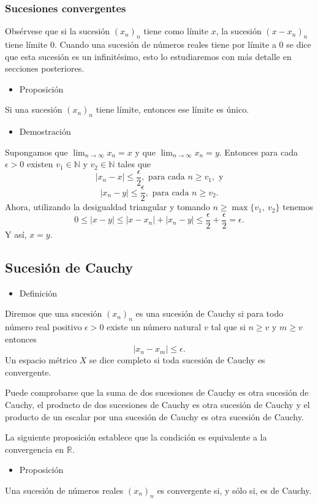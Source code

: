 \documentclass[12pt]{article}
\begin{document}
\subsubsection{Sucesiones convergentes}
Obsérvese que si la sucesión $(x_n)_n$ tiene como límite $x$, la sucesión $(x-x_n)_n$ tiene límite 0. Cuando una sucesión de números reales tiene por límite a 0 se dice que esta sucesión es un infinitésimo, esto lo estudiaremos con más detalle en secciones posteriores.
\begin{itemize}[label=\color{red}\textbullet, leftmargin=*]
	\item \color{lightblue}Proposición
\end{itemize}
Si una sucesión $(x_n)_n$ tiene límite, entonces ese límite es único.
\begin{itemize}[label=\color{red}\textbullet, leftmargin=*]
	\item \color{lightblue}Demostración
\end{itemize}
Supongamos que $\lim_{n\to\infty}x_n=x$ y que $\lim_{n\to\infty}x_n=y$. Entonces para cada $\epsilon>0$ existen $v_1\in\mathbb{N}$ y $v_2\in\mathbb{N}$ tales que \[ |x_n-x|\le\frac{\epsilon}{2}, \text{ para cada }n\ge v_1,\text{ y} \]\[ |x_n-y|\le\frac{\epsilon}{2}, \text{ para cada }n\ge v_2.\]
Ahora, utilizando la desigualdad triangular y tomando $n\ge\max\{v_1,~v_2\}$ tenemos \[ 0\le|x-y|\le|x-x_n|+|x_n-y|\le\frac{\epsilon}{2}+\dfrac{\epsilon}{2}=\epsilon. \]
Y así, $x=y$.
\subsection{Sucesión de Cauchy}
\begin{itemize}[label=\color{red}\textbullet, leftmargin=*]
	\item \color{lightblue}Definición 
\end{itemize}
Diremos que una sucesión $(x_n)_n$ es una sucesión de Cauchy si para todo número real positivo $\epsilon>0$ existe un número natural $v$ tal que si $n\ge v$ y $m\ge v$ entonces \[ |x_n-x_m|\le\epsilon. \]
Un espacio métrico $X$ se dice completo si toda sucesión de Cauchy es convergente.

Puede comprobarse que la suma de dos sucesiones de Cauchy es otra sucesión de Cauchy, el producto de dos sucesiones de Cauchy es otra sucesión de Cauchy y el producto de un escalar por una sucesión de Cauchy es otra sucesión de Cauchy.

La siguiente proposición establece que la condición es equivalente a la convergencia en $\mathbb{R}$.
\begin{itemize}[label=\color{red}\textbullet, leftmargin=*]
	\item \color{lightblue}Proposición
\end{itemize}
Una sucesión de números reales $(x_n)_n$ es convergente si, y sólo si, es de Cauchy.
\end{document}
